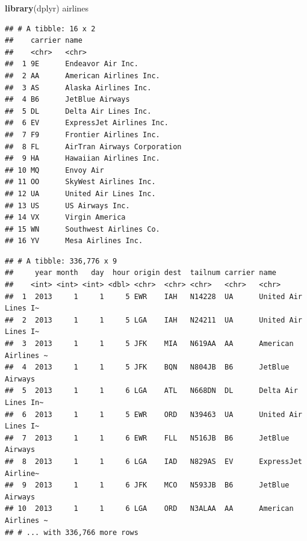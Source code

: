 \documentclass[]{book}
\newenvironment{Shaded}{\begin{snugshade}}{\end{snugshade}}
\newcommand{\CommentTok}[1]{\textcolor[rgb]{0.56,0.35,0.01}{\textit{#1}}}
\newcommand{\KeywordTok}[1]{\textcolor[rgb]{0.13,0.29,0.53}{\textbf{#1}}}
\newcommand{\NormalTok}[1]{#1}
\newcommand{\OperatorTok}[1]{\textcolor[rgb]{0.81,0.36,0.00}{\textbf{#1}}}
\newcommand{\StringTok}[1]{\textcolor[rgb]{0.31,0.60,0.02}{#1}}
\theoremstyle{definition}
\theoremstyle{definition}
\theoremstyle{definition}
\theoremstyle{remark}
\begin{document}
\begin{Shaded}
\begin{Highlighting}[]
\KeywordTok{library}\NormalTok{(dplyr) }
\NormalTok{airlines  }
\end{Highlighting}
\end{Shaded}

\begin{verbatim}
## # A tibble: 16 x 2
##    carrier name                       
##    <chr>   <chr>                      
##  1 9E      Endeavor Air Inc.          
##  2 AA      American Airlines Inc.     
##  3 AS      Alaska Airlines Inc.       
##  4 B6      JetBlue Airways            
##  5 DL      Delta Air Lines Inc.       
##  6 EV      ExpressJet Airlines Inc.   
##  7 F9      Frontier Airlines Inc.     
##  8 FL      AirTran Airways Corporation
##  9 HA      Hawaiian Airlines Inc.     
## 10 MQ      Envoy Air                  
## 11 OO      SkyWest Airlines Inc.      
## 12 UA      United Air Lines Inc.      
## 13 US      US Airways Inc.            
## 14 VX      Virgin America             
## 15 WN      Southwest Airlines Co.     
## 16 YV      Mesa Airlines Inc.
\end{verbatim}

\begin{Shaded}
\end{Shaded}

\begin{verbatim}
## # A tibble: 336,776 x 9
##     year month   day  hour origin dest  tailnum carrier name               
##    <int> <int> <int> <dbl> <chr>  <chr> <chr>   <chr>   <chr>              
##  1  2013     1     1     5 EWR    IAH   N14228  UA      United Air Lines I~
##  2  2013     1     1     5 LGA    IAH   N24211  UA      United Air Lines I~
##  3  2013     1     1     5 JFK    MIA   N619AA  AA      American Airlines ~
##  4  2013     1     1     5 JFK    BQN   N804JB  B6      JetBlue Airways    
##  5  2013     1     1     6 LGA    ATL   N668DN  DL      Delta Air Lines In~
##  6  2013     1     1     5 EWR    ORD   N39463  UA      United Air Lines I~
##  7  2013     1     1     6 EWR    FLL   N516JB  B6      JetBlue Airways    
##  8  2013     1     1     6 LGA    IAD   N829AS  EV      ExpressJet Airline~
##  9  2013     1     1     6 JFK    MCO   N593JB  B6      JetBlue Airways    
## 10  2013     1     1     6 LGA    ORD   N3ALAA  AA      American Airlines ~
## # ... with 336,766 more rows
\end{verbatim}
\end{document}
